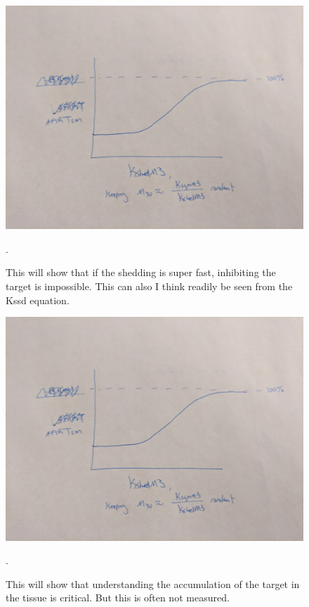\begin{figure}[H]
\centering
\includegraphics[width=\textwidth]{figures/FastShedding.jpg}
\caption{This will show that if the shedding is super fast, inhibiting the target is impossible.  This can also I think readily be seen from the Kssd equation. 
\label{fig:shedding}}.
\end{figure}

\begin{figure}[H]
\centering
\includegraphics[width=\textwidth]{figures/FastShedding.jpg}
\caption{This will show that understanding the accumulation of the target in the tissue is critical.  But this is often not measured.  
\label{fig:accumulation}}.
\end{figure}
